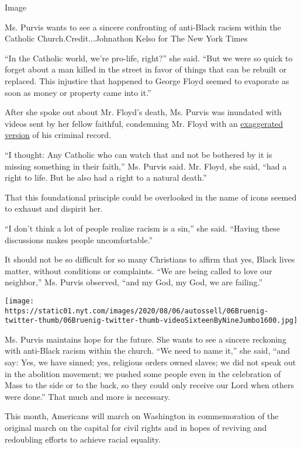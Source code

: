 Image

Ms. Purvis wants to see a sincere confronting of anti-Black racism
within the Catholic Church.Credit...Johnathon Kelso for The New York
Times

``In the Catholic world, we're pro-life, right?'' she said. ``But we
were so quick to forget about a man killed in the street in favor of
things that can be rebuilt or replaced. This injustice that happened to
George Floyd seemed to evaporate as soon as money or property came into
it.''

After she spoke out about Mr. Floyd's death, Ms. Purvis was inundated
with videos sent by her fellow faithful, condemning Mr. Floyd with an
\href{https://www.snopes.com/news/2020/06/12/george-floyd-criminal-record/}{exaggerated
version} of his criminal record.

``I thought: Any Catholic who can watch that and not be bothered by it
is missing something in their faith,'' Ms. Purvis said. Mr. Floyd, she
said, ``had a right to life. But he also had a right to a natural
death.''

That this foundational principle could be overlooked in the name of
icons seemed to exhaust and dispirit her.

``I don't think a lot of people realize racism is a sin,'' she said.
``Having these discussions makes people uncomfortable.''

It should not be so difficult for so many Christians to affirm that yes,
Black lives matter, without conditions or complaints. ``We are being
called to love our neighbor,'' Ms. Purvis observed, ``and my God, my
God, we are failing.''

\texttt{[image: https://static01.nyt.com/images/2020/08/06/autossell/06Bruenig-twitter-thumb/06Bruenig-twitter-thumb-videoSixteenByNineJumbo1600.jpg]}

Ms. Purvis maintains hope for the future. She wants to see a sincere
reckoning with anti-Black racism within the church. ``We need to name
it,'' she said, ``and say: Yes, we have sinned; yes, religious orders
owned slaves; we did not speak out in the abolition movement; we pushed
some people even in the celebration of Mass to the side or to the back,
so they could only receive our Lord when others were done.'' That much
and more is necessary.

This month, Americans will march on Washington in commemoration of the
original march on the capital for civil rights and in hopes of reviving
and redoubling efforts to achieve racial equality.

